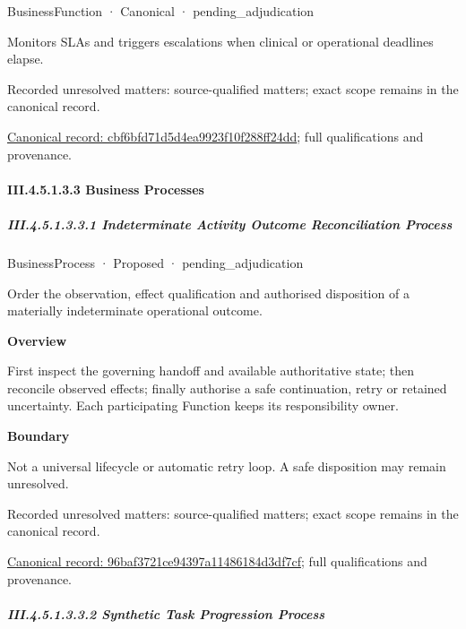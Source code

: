 \label{element:cbf6bfd71d5d4ea9923f10f288ff24dd}
{\small BusinessFunction · Canonical · pending\_adjudication}\par

Monitors SLAs and triggers escalations when clinical or operational deadlines elapse.


{\small Recorded unresolved matters: source-qualified matters; exact scope remains in the canonical record.}\par
{\footnotesize \href{../../../../../../../continuum/business/business-function/cbf6bfd71d5d4ea9923f10f288ff24dd.md}{Canonical record: cbf6bfd71d5d4ea9923f10f288ff24dd}; full qualifications and provenance.}\par
\paragraph*{III.4.5.1.3.3 Business Processes}
\label{navigation:III.4.5.1.3.3}

\subparagraph*{III.4.5.1.3.3.1 Indeterminate Activity Outcome Reconciliation Process}
\label{navigation:III.4.5.1.3.3.1}

\label{element:96baf3721ce94397a11486184d3df7cf}
{\small BusinessProcess · Proposed · pending\_adjudication}\par

Order the observation, effect qualification and authorised disposition of a materially indeterminate operational outcome.



\textbf{Overview}



First inspect the governing handoff and available authoritative state; then reconcile observed effects; finally authorise a safe continuation, retry or retained uncertainty. Each participating Function keeps its responsibility owner.



\textbf{Boundary}



Not a universal lifecycle or automatic retry loop. A safe disposition may remain unresolved.


{\small Recorded unresolved matters: source-qualified matters; exact scope remains in the canonical record.}\par
{\footnotesize \href{../../../../../../../continuum/business/business-process/96baf3721ce94397a11486184d3df7cf.md}{Canonical record: 96baf3721ce94397a11486184d3df7cf}; full qualifications and provenance.}\par
\subparagraph*{III.4.5.1.3.3.2 Synthetic Task Progression Process}
\label{navigation:III.4.5.1.3.3.2}

